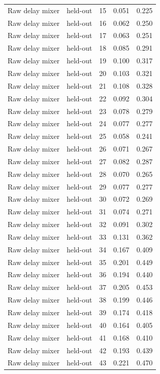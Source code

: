 \begin{tabular}{llrrr}
Raw delay mixer & held-out & 15 & 0.051 & 0.225 \\
Raw delay mixer & held-out & 16 & 0.062 & 0.250 \\
Raw delay mixer & held-out & 17 & 0.063 & 0.251 \\
Raw delay mixer & held-out & 18 & 0.085 & 0.291 \\
Raw delay mixer & held-out & 19 & 0.100 & 0.317 \\
Raw delay mixer & held-out & 20 & 0.103 & 0.321 \\
Raw delay mixer & held-out & 21 & 0.108 & 0.328 \\
Raw delay mixer & held-out & 22 & 0.092 & 0.304 \\
Raw delay mixer & held-out & 23 & 0.078 & 0.279 \\
Raw delay mixer & held-out & 24 & 0.077 & 0.277 \\
Raw delay mixer & held-out & 25 & 0.058 & 0.241 \\
Raw delay mixer & held-out & 26 & 0.071 & 0.267 \\
Raw delay mixer & held-out & 27 & 0.082 & 0.287 \\
Raw delay mixer & held-out & 28 & 0.070 & 0.265 \\
Raw delay mixer & held-out & 29 & 0.077 & 0.277 \\
Raw delay mixer & held-out & 30 & 0.072 & 0.269 \\
Raw delay mixer & held-out & 31 & 0.074 & 0.271 \\
Raw delay mixer & held-out & 32 & 0.091 & 0.302 \\
Raw delay mixer & held-out & 33 & 0.131 & 0.362 \\
Raw delay mixer & held-out & 34 & 0.167 & 0.409 \\
Raw delay mixer & held-out & 35 & 0.201 & 0.449 \\
Raw delay mixer & held-out & 36 & 0.194 & 0.440 \\
Raw delay mixer & held-out & 37 & 0.205 & 0.453 \\
Raw delay mixer & held-out & 38 & 0.199 & 0.446 \\
Raw delay mixer & held-out & 39 & 0.174 & 0.418 \\
Raw delay mixer & held-out & 40 & 0.164 & 0.405 \\
Raw delay mixer & held-out & 41 & 0.168 & 0.410 \\
Raw delay mixer & held-out & 42 & 0.193 & 0.439 \\
Raw delay mixer & held-out & 43 & 0.221 & 0.470 \\

\end{tabular}
